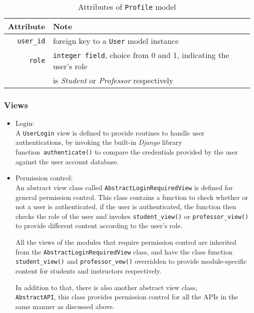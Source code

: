 \begin{table}[ht]
    \centering
    \caption{Attributes of \texttt{Profile} model}
    \label{tab:PROFILE_ATTR}
    \renewcommand{\arraystretch}{1.3}
    \begin{tabular}[ht]{r|l}
        \hline
        Attribute & Note \\
        \hline
        \hline
        \texttt{user\_id} & foreign key to a \texttt{User} model instance \\
        \hline
        \texttt{role} & \texttt{integer field}, choice from 0 and 1, indicating the
            user's role \\
           & is \emph{Student} or \emph{Professor} respectively \\
        \hline
    \end{tabular}
    \renewcommand{\arraystretch}{1}
\end{table}


\subsubsection{Views}

\begin{itemize}
    \item Login: \\
        A \texttt{UserLogin} view is defined to provide routines to handle user
        authentications, by invoking the built-in \emph{Django} library
        function~\texttt{authenticate()}
        to compare the credentials provided
        by the user against the user account database.

    \item Permission control: \\
        An abstract view class called \texttt{AbstractLoginRequiredView} is
        defined for general permission control. This class contains a function
        to check whether or not a user is authenticated, if the user is
        authenticated, the function then checks the role of the user and
        invokes \texttt{student\_view()} or \texttt{professor\_view()} to
        provide different content according to the user's role.

        All the views of the modules that require permission control are
        inherited from the \texttt{AbstractLoginRequiredView} class, and have
        the class function \\ \texttt{student\_view()} and
        \texttt{professor\_vew()} overridden to provide module-specific
        content for students and instructors respectively.

        In addition to that, there is also another abstract view class, \\
        \texttt{AbstractAPI}, this class provides permission
        control for all the APIs in the same manner as discussed above.
\end{itemize}

